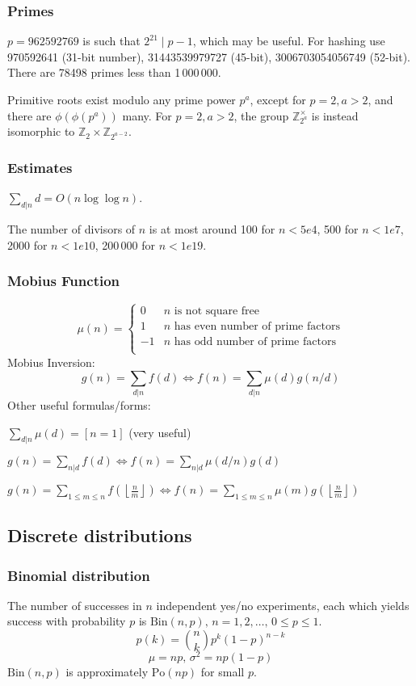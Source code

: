 \documentclass[
	a4paper,
	landscape,
	10pt,
]{article}
\begin{document}
\begin{multicols}{3}
\subsubsection*{Primes}
	$p=962592769$ is such that $2^{21} \mid p-1$, which may be useful. For hashing
	use 970592641 (31-bit number), 31443539979727 (45-bit), 3006703054056749
	(52-bit). There are 78498 primes less than 1\,000\,000.

	Primitive roots exist modulo any prime power $p^a$, except for $p = 2, a > 2$, and there are $\phi(\phi(p^a))$ many.
	For $p = 2, a > 2$, the group $\mathbb Z_{2^a}^\times$ is instead isomorphic to $\mathbb Z_2 \times \mathbb Z_{2^{a-2}}$.

\subsubsection*{Estimates}
	$\sum_{d|n} d = O(n \log \log n)$.

	The number of divisors of $n$ is at most around 100 for $n < 5e4$, 500 for $n < 1e7$, 2000 for $n < 1e10$, 200\,000 for $n < 1e19$.

\subsubsection*{Mobius Function}
\[
	\mu(n) = \begin{cases} 0 & n \textrm{ is not square free}\\ 1 & n \textrm{ has even number of prime factors}\\ -1 & n \textrm{ has odd number of prime factors}\\\end{cases}
\]
  Mobius Inversion:
  \[ g(n) = \sum_{d|n} f(d) \Leftrightarrow f(n) = \sum_{d|n} \mu(d)g(n/d) \]
  Other useful formulas/forms:

  $ \sum_{d | n} \mu(d) = [ n = 1] $ (very useful)

  $ g(n) = \sum_{n|d} f(d) \Leftrightarrow f(n) = \sum_{n|d} \mu(d/n)g(d)$

 $ g(n) = \sum_{1 \leq m \leq n} f(\left\lfloor\frac{n}{m}\right \rfloor ) \Leftrightarrow f(n) = \sum_{1\leq m\leq n} \mu(m)g(\left\lfloor\frac{n}{m}\right\rfloor)$



\subsection{Discrete distributions}

\subsubsection*{Binomial distribution}
The number of successes in $n$ independent yes/no experiments, each which yields success with probability $p$ is $\textrm{Bin}(n,p),\,n=1,2,\dots,\, 0\leq p\leq1$.
\[p(k)=\binom{n}{k}p^k(1-p)^{n-k}\]
\[\mu = np,\,\sigma^2=np(1-p)\]
$\textrm{Bin}(n,p)$ is approximately $\textrm{Po}(np)$ for small $p$.


\end{multicols}
\end{document}
